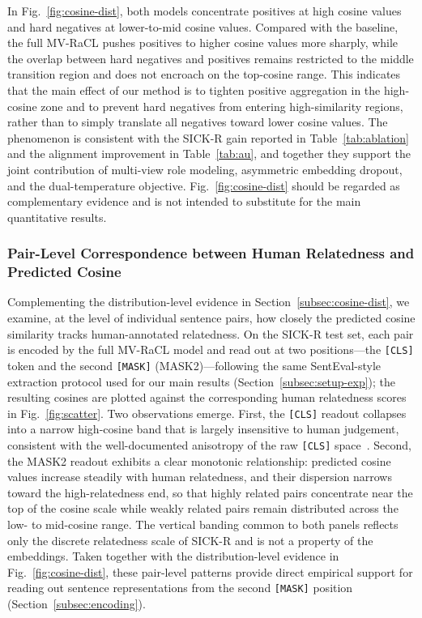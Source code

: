 \documentclass[a4paper,fleqn]{cas-dc}
\begin{document}
In Fig.~\ref{fig:cosine-dist}, both models concentrate positives at high cosine values and hard negatives at lower-to-mid cosine values. Compared with the baseline, the full MV-RaCL pushes positives to higher cosine values more sharply, while the overlap between hard negatives and positives remains restricted to the middle transition region and does not encroach on the top-cosine range. This indicates that the main effect of our method is to tighten positive aggregation in the high-cosine zone and to prevent hard negatives from entering high-similarity regions, rather than to simply translate all negatives toward lower cosine values. The phenomenon is consistent with the SICK-R gain reported in Table~\ref{tab:ablation} and the alignment improvement in Table~\ref{tab:au}, and together they support the joint contribution of multi-view role modeling, asymmetric embedding dropout, and the dual-temperature objective. Fig.~\ref{fig:cosine-dist} should be regarded as complementary evidence and is not intended to substitute for the main quantitative results.

\subsubsection{Pair-Level Correspondence between Human Relatedness and Predicted Cosine}
\label{subsec:scatter}

Complementing the distribution-level evidence in Section~\ref{subsec:cosine-dist}, we examine, at the level of individual sentence pairs, how closely the predicted cosine similarity tracks human-annotated relatedness. On the SICK-R test set, each pair is encoded by the full MV-RaCL model and read out at two positions---the \texttt{[CLS]} token and the second \texttt{[MASK]} (MASK2)---following the same SentEval-style extraction protocol used for our main results (Section~\ref{subsec:setup-exp}); the resulting cosines are plotted against the corresponding human relatedness scores in Fig.~\ref{fig:scatter}. Two observations emerge. First, the \texttt{[CLS]} readout collapses into a narrow high-cosine band that is largely insensitive to human judgement, consistent with the well-documented anisotropy of the raw \texttt{[CLS]} space~\cite{kurz2026tacl}. Second, the MASK2 readout exhibits a clear monotonic relationship: predicted cosine values increase steadily with human relatedness, and their dispersion narrows toward the high-relatedness end, so that highly related pairs concentrate near the top of the cosine scale while weakly related pairs remain distributed across the low- to mid-cosine range. The vertical banding common to both panels reflects only the discrete relatedness scale of SICK-R and is not a property of the embeddings. Taken together with the distribution-level evidence in Fig.~\ref{fig:cosine-dist}, these pair-level patterns provide direct empirical support for reading out sentence representations from the second \texttt{[MASK]} position (Section~\ref{subsec:encoding}).
\end{document}

